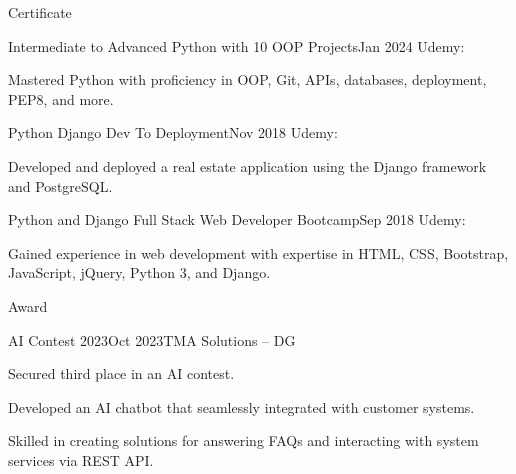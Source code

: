 \documentclass[12pt,a4paper]{cv}
\begin{document}
\begin{cvSection}{Certificate}

	\begin{cvSubsection}{Intermediate to Advanced Python with 10 OOP Projects}{Jan 2024}{
			Udemy: 
		}
		\item[] Mastered Python with proficiency in OOP, Git, APIs, databases, deployment, PEP8, and more.
	\end{cvSubsection}


	\begin{cvSubsection}{Python Django Dev To Deployment}{Nov 2018}{
			Udemy: 
		}
		\item[] Developed and deployed a real estate application using the Django framework and PostgreSQL.
	\end{cvSubsection}


	\begin{cvSubsection}{Python and Django Full Stack Web Developer Bootcamp}{Sep 2018}{
			Udemy: 
		}
		\item[] Gained experience in web development with expertise in HTML, CSS, Bootstrap, JavaScript, jQuery, Python 3, and Django.
	\end{cvSubsection}

\end{cvSection}


\begin{cvSection}{Award}

	\begin{cvSubsection}{AI Contest 2023}{Oct 2023}{TMA Solutions -- DG}
		\item Secured third place in an AI contest.
		\item Developed an AI chatbot that seamlessly integrated with customer systems.
		\item Skilled in creating solutions for answering FAQs and interacting with system services via REST API.
	\end{cvSubsection}

\end{cvSection}
\end{document}

